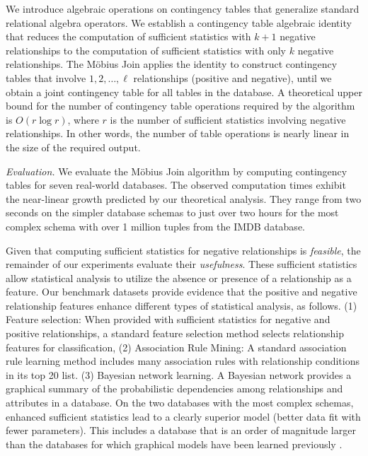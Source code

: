 \documentclass{sig-alternate-2013}
\begin{document}
We introduce algebraic operations on contingency tables that generalize standard relational algebra operators. 
We establish a contingency table algebraic identity that reduces the computation of sufficient statistics with $k+1$ negative relationships to the computation of sufficient statistics with only $k$ negative relationships. 
The M\"obius Join applies the identity to construct contingency tables that involve $1,2,\ldots,\ell$ relationships (positive and negative), until we obtain a joint contingency table for all tables in the database. A theoretical upper bound for the number of contingency table operations required by the algorithm is $O(r \log r)$,  where $r$ is the number of sufficient statistics involving negative relationships. In other words, the number of table operations is nearly linear in the size of the required output. 

\emph{Evaluation.} We evaluate the M\"obius Join algorithm by computing contingency tables for seven real-world databases. The observed computation times exhibit the near-linear growth predicted by our theoretical analysis. 
They range from two seconds on the simpler database schemas to just over two hours for the most complex schema with over 1 million tuples from the IMDB database.

Given that computing sufficient statistics for negative relationships is {\em feasible}, the remainder of our experiments evaluate their {\em usefulness}. These sufficient statistics allow statistical analysis to utilize the absence or presence of a relationship as a feature. 
Our benchmark datasets provide evidence that the positive and negative relationship features enhance different types of statistical analysis, as follows. (1) Feature selection: When provided with sufficient statistics for negative and positive relationships,
a standard feature selection method selects relationship features for classification,
(2) Association Rule Mining: A standard association rule learning method includes many association rules with relationship conditions in its top 20 list. 
(3) Bayesian network learning. A Bayesian network provides a graphical summary of the probabilistic dependencies among relationships and attributes in a database. On the two databases with the most complex schemas, enhanced sufficient statistics lead to a clearly superior model (better data fit with fewer parameters). This includes a database that is an order of magnitude larger than the databases for which graphical models  have been learned previously \cite{Schulte2012}. 
\end{document}
